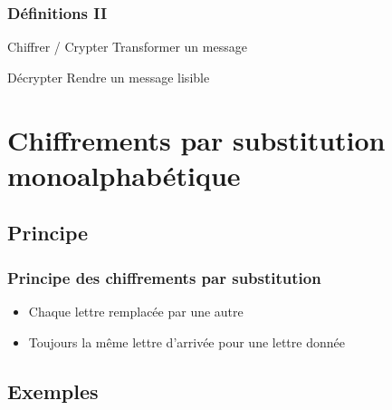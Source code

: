 \documentclass[xcolor={dvipsnames}]{beamer}
\begin{document}
\begin{frame}
\frametitle{Définitions II}	

	\begin{block}{Chiffrer / Crypter}
		Transformer un message
	\end{block}\pause
	
	\begin{block}{Décrypter}
		Rendre un message lisible
	\end{block}
	

\end{frame}
\section{Chiffrements par substitution monoalphabétique}

\subsection{Principe}

\begin{frame}
\frametitle{Principe des chiffrements par substitution}

\begin{itemize}
	\item Chaque lettre remplacée par une autre
	\item Toujours la même lettre d'arrivée pour une lettre donnée
\end{itemize}

\end{frame}


\subsection{Exemples}
\end{document}
